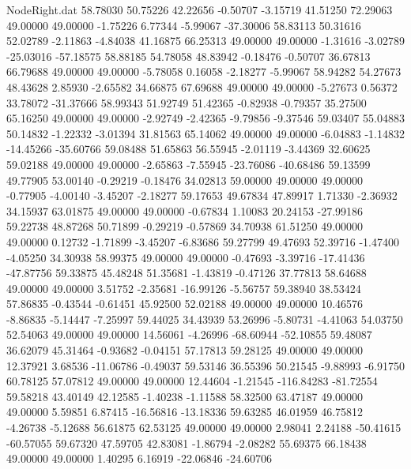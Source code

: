 \begin{filecontents}{NodeRight.dat}
  58.78030   50.75226   42.22656    -0.50707   -3.15719   41.51250   72.29063   49.00000   49.00000   -1.75226    6.77344   -5.99067  -37.30006
  58.83113   50.31616   52.02789    -2.11863   -4.84038   41.16875   66.25313   49.00000   49.00000   -1.31616   -3.02789  -25.03016  -57.18575
  58.88185   54.78058   48.83942    -0.18476   -0.50707   36.67813   66.79688   49.00000   49.00000   -5.78058    0.16058   -2.18277   -5.99067
  58.94282   54.27673   48.43628     2.85930   -2.65582   34.66875   67.69688   49.00000   49.00000   -5.27673    0.56372   33.78072  -31.37666
  58.99343   51.92749   51.42365    -0.82938   -0.79357   35.27500   65.16250   49.00000   49.00000   -2.92749   -2.42365   -9.79856   -9.37546
  59.03407   55.04883   50.14832    -1.22332   -3.01394   31.81563   65.14062   49.00000   49.00000   -6.04883   -1.14832  -14.45266  -35.60766
  59.08488   51.65863   56.55945    -2.01119   -3.44369   32.60625   59.02188   49.00000   49.00000   -2.65863   -7.55945  -23.76086  -40.68486
  59.13599   49.77905   53.00140    -0.29219   -0.18476   34.02813   59.00000   49.00000   49.00000   -0.77905   -4.00140   -3.45207   -2.18277
  59.17653   49.67834   47.89917     1.71330   -2.36932   34.15937   63.01875   49.00000   49.00000   -0.67834    1.10083   20.24153  -27.99186
  59.22738   48.87268   50.71899    -0.29219   -0.57869   34.70938   61.51250   49.00000   49.00000    0.12732   -1.71899   -3.45207   -6.83686
  59.27799   49.47693   52.39716    -1.47400   -4.05250   34.30938   58.99375   49.00000   49.00000   -0.47693   -3.39716  -17.41436  -47.87756
  59.33875   45.48248   51.35681    -1.43819   -0.47126   37.77813   58.64688   49.00000   49.00000    3.51752   -2.35681  -16.99126   -5.56757
  59.38940   38.53424   57.86835    -0.43544   -0.61451   45.92500   52.02188   49.00000   49.00000   10.46576   -8.86835   -5.14447   -7.25997
  59.44025   34.43939   53.26996    -5.80731   -4.41063   54.03750   52.54063   49.00000   49.00000   14.56061   -4.26996  -68.60944  -52.10855
  59.48087   36.62079   45.31464    -0.93682   -0.04151   57.17813   59.28125   49.00000   49.00000   12.37921    3.68536  -11.06786   -0.49037
  59.53146   36.55396   50.21545    -9.88993   -6.91750   60.78125   57.07812   49.00000   49.00000   12.44604   -1.21545 -116.84283  -81.72554
  59.58218   43.40149   42.12585    -1.40238   -1.11588   58.32500   63.47187   49.00000   49.00000    5.59851    6.87415  -16.56816  -13.18336
  59.63285   46.01959   46.75812    -4.26738   -5.12688   56.61875   62.53125   49.00000   49.00000    2.98041    2.24188  -50.41615  -60.57055
  59.67320   47.59705   42.83081    -1.86794   -2.08282   55.69375   66.18438   49.00000   49.00000    1.40295    6.16919  -22.06846  -24.60706

\end{filecontents}
